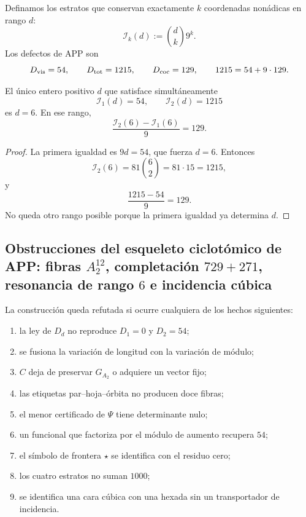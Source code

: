 Definamos los estratos que conservan exactamente \(k\) coordenadas
nonádicas en rango \(d\):
\[
 \mathcal I_k(d):=\binom dk9^k.
\]
Los defectos de APP son
\[
 D_{\rm vis}=54,
 \qquad
 D_{\rm tot}=1215,
 \qquad
 D_{\rm coc}=129,
 \qquad
 1215=54+9\cdot129.
\]

\begin{theorem}
\label{p12-83-c1-s5:thm:resonancia-binomial-autonoma}
El único entero positivo \(d\) que satisface simultáneamente
\[
 \mathcal I_1(d)=54,
 \qquad
 \mathcal I_2(d)=1215
\]
es \(d=6\). En ese rango,
\[
 \frac{\mathcal I_2(6)-\mathcal I_1(6)}9=129.
\]
\end{theorem}

\begin{proof}
La primera igualdad es \(9d=54\), que fuerza \(d=6\). Entonces
\[
 \mathcal I_2(6)=81\binom62=81\cdot15=1215,
\]
y
\[
 \frac{1215-54}{9}=129.
\]
No queda otro rango posible porque la primera igualdad ya determina \(d\).
\end{proof}

\subsection{Obstrucciones del esqueleto ciclotómico de APP: fibras \(A_2^{12}\), completación \(729+271\), resonancia de rango \(6\) e incidencia cúbica}

\begin{criterion}
La construcción queda refutada si ocurre cualquiera de los hechos
siguientes:
\begin{enumerate}
 \item la ley de \(D_d\) no reproduce \(D_1=0\) y \(D_2=54\);
 \item se fusiona la variación de longitud con la variación de módulo;
 \item \(C\) deja de preservar \(G_{A_2}\) o adquiere un vector fijo;
 \item las etiquetas par--hoja--órbita no producen doce fibras;
 \item el menor certificado de \(\Psi\) tiene determinante nulo;
 \item un funcional que factoriza por el módulo de aumento recupera \(54\);
 \item el símbolo de frontera \(\star\) se identifica con el residuo cero;
 \item los cuatro estratos no suman \(1000\);
 \item se identifica una cara cúbica con una hexada sin un transportador de
       incidencia.
\end{enumerate}
\end{criterion}

